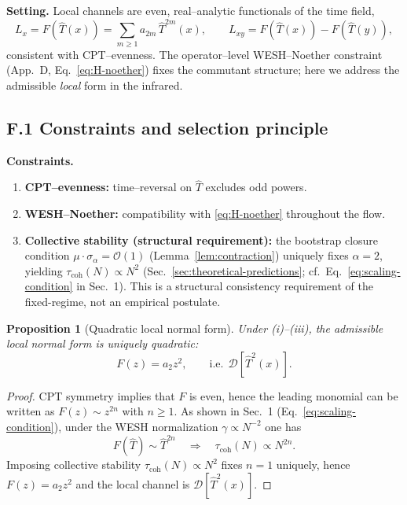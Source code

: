 \documentclass[12pt,a4paper]{article}
\newtheorem{proposition}{Proposition}[section]
\numberwithin{equation}{section}
\begin{document}
\vspace{0.5cm}
\noindent\textbf{Setting.}
Local channels are even, real–analytic functionals of the time field,
\[
L_x=F(\hat T(x))=\sum_{m\ge1}a_{2m}\,\hat T^{2m}(x),\qquad
L_{xy}=F(\hat T(x))-F(\hat T(y)),
\]
consistent with CPT–evenness. The operator–level WESH–Noether constraint (App.~D, Eq.~\eqref{eq:H-noether}) fixes the commutant structure; here we address the admissible \emph{local} form in the infrared.

\subsection*{F.1 Constraints and selection principle}
\vspace{0.2cm}

\noindent\textbf{Constraints.}
\begin{enumerate}[label=(\roman*),leftmargin=1.8cm,itemsep=0.2em]
\item \textbf{CPT–evenness:} time–reversal on $\hat T$ excludes odd powers.
\item \textbf{WESH–Noether:} compatibility with \eqref{eq:H-noether} throughout the flow.
\item \textbf{Collective stability (structural requirement):}
the bootstrap closure condition $\mu \cdot \sigma_\alpha = \mathcal{O}(1)$ (Lemma~\ref{lem:contraction}) uniquely fixes $\alpha = 2$, yielding $\tau_{\mathrm{coh}}(N) \propto N^{2}$ (Sec.~\ref{sec:theoretical-predictions}; cf.\ Eq.~\eqref{eq:scaling-condition} in Sec.~1). This is a structural consistency requirement of the fixed-regime, not an empirical postulate.
\end{enumerate}

\begin{proposition}[Quadratic local normal form]\label{prop:I-quadratic}
Under (i)–(iii), the admissible local normal form is uniquely quadratic:
\[
F(z)=a_2 z^2,\qquad \text{i.e.}\ \ \mathcal D[\hat T^2(x)].
\]
\end{proposition}

\begin{proof}
CPT symmetry implies that $F$ is even, hence the leading monomial can be written as $F(z) \sim z^{2n}$ with $n \ge 1$. As shown in Sec.~1 (Eq.~\eqref{eq:scaling-condition}), under the WESH normalization $\gamma \propto N^{-2}$ one has
\[
F(\hat T) \sim \hat T^{2n} \quad \Rightarrow \quad \tau_{\mathrm{coh}}(N) \propto N^{2n}.
\]
Imposing collective stability $\tau_{\mathrm{coh}}(N) \propto N^{2}$ fixes $n = 1$ uniquely, hence $F(z) = a_2 z^2$ and the local channel is $\mathcal{D}[\hat T^2(x)]$.
\end{proof}
\end{document}
